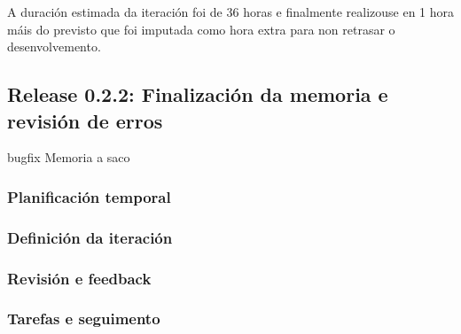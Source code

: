         A duración estimada da iteración foi de 36 horas e finalmente 
realizouse en 1 hora máis do previsto que foi imputada como hora extra para non 
retrasar o desenvolvemento.

    \subsection{Release 0.2.2: Finalización da memoria e revisión de erros}
    bugfix
    Memoria a saco
      \subsubsection{Planificación temporal}
      \subsubsection{Definición da iteración}
      \subsubsection{Revisión e feedback}
      \subsubsection{Tarefas e seguimento}
% 


